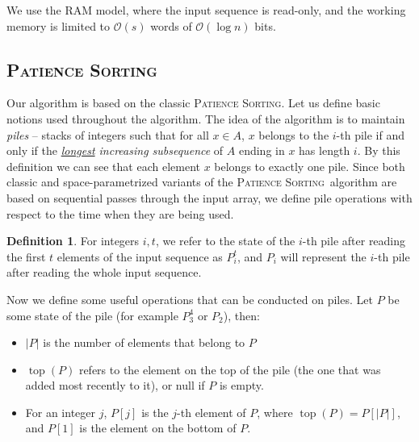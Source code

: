 \documentclass[lic, english, shortabstract]{iithesis}
\theoremstyle{plain}
\newcommand{\Psort}{\textsc{Patience Sorting}}
\theoremstyle{definition}
\newtheorem{definition}{Definition}[section]
\begin{document}
We use the RAM model, where the input sequence is read-only, and the working memory is limited to $\mathcal{O}(s)$ words of $\mathcal{O}(\log n)$ bits.


\subsection{\Psort}

Our algorithm is based on the classic \Psort. Let us define basic notions used throughout the algorithm.
The idea of the algorithm is to maintain \textit{piles} -- stacks of integers such that for all $x \in A$, $x$ belongs to the $i$-th pile if and only if the \textit{\underline{longest} increasing subsequence} of $A$ ending in $x$ has length $i$.
By this definition we can see that each element $x$ belongs to exactly one pile.
Since both classic and space-parametrized variants of the \Psort\ algorithm are based on sequential passes through the input array, we define
pile operations with respect to the time when they are being used.

\begin{definition}
For integers $i, t$, we refer to the state of the $i$-th pile after reading the first $t$ elements of the input sequence as $P_{i}^{t}$, and $P_i$ will represent the $i$-th pile after reading the whole input sequence.
\end{definition}
Now we define some useful operations that can be conducted on piles.
Let $P$ be some state of the pile (for example $P_3^4$ or $P_2$), then:
\begin{itemize}
\item $|P|$ is the number of elements that belong to $P$
\item $\operatorname{top}(P)$ refers to the element on the top of the pile (the one that was added most recently to it), or null if $P$ is empty.
\item For an integer $j$, $P[j]$ is the $j$-th element of $P$, where $\operatorname{top}(P) = P[|P|]$, and $P[1]$ is the element on the bottom of $P$. 
\end{itemize}
\end{document}
